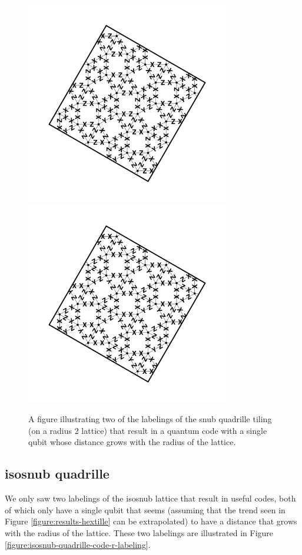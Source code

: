 \documentclass[12pt]{amsbook}
\theoremstyle{plain}
\theoremstyle{definition}
\theoremstyle{remark}
\begin{document}
\begin{figure}
\includegraphics[width=3.5in]{images/snub-quadrille-code-r-labeling-1} %
\includegraphics[width=3.5in]{images/snub-quadrille-code-r-labeling-2} %
\caption{
\label{figure:snub-quadrille-code-r-labeling}
A figure illustrating two of the labelings of the snub quadrille tiling (on a radius 2 lattice) that result in a quantum code with a single qubit whose distance grows with the radius of the lattice.
}
\end{figure}
\subsection{isosnub quadrille}

We only saw two labelings of the isosnub lattice that result in useful codes, both of which only have a single qubit that seems (assuming that the trend seen in Figure \ref{figure:results-hextille} can be extrapolated) to have a distance that grows with the radius of the lattice.  These two labelings are illustrated in Figure \ref{figure:isosnub-quadrille-code-r-labeling}.
\end{document}
